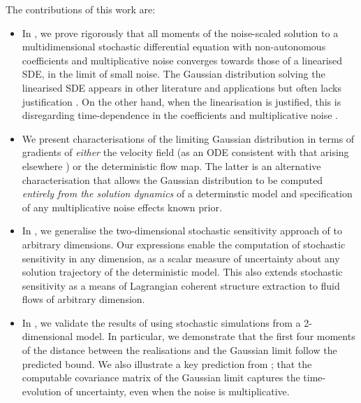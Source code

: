 The contributions of this work are:
\begin{itemize}
	\item In , we prove rigorously that all moments of the noise-scaled solution to a multidimensional stochastic differential equation with non-autonomous coefficients and multiplicative noise converges towards those of a linearised SDE, in the limit of small noise.
	      The Gaussian distribution solving the linearised SDE appears in other literature and applications but often lacks justification \cite{Jazwinski_2014_StochasticProcessesFiltering, SarkkaSolin_2019_AppliedStochasticDifferential}.
	      On the other hand, when the linearisation is justified, this is disregarding time-dependence in the coefficients and multiplicative noise \cite{Sanz-AlonsoStuart_2017_GaussianApproximationsSmall}.

	\item We present characterisations of the limiting Gaussian distribution in terms of gradients of \emph{either} the velocity field (as an ODE consistent with that arising elsewhere \cite{Jazwinski_2014_StochasticProcessesFiltering, Sanz-AlonsoStuart_2017_GaussianApproximationsSmall, SarkkaSolin_2019_AppliedStochasticDifferential}) or the deterministic flow map.
	      The latter is an alternative characterisation that allows the Gaussian distribution to be computed \emph{entirely from the solution dynamics} of a determinstic model and specification of any multiplicative noise effects known prior.

	\item In , we generalise the two-dimensional stochastic sensitivity approach of \cite{Balasuriya_2020_StochasticSensitivityComputable} to arbitrary dimensions.
	      Our expressions enable the computation of stochastic sensitivity in any dimension, as a scalar measure of uncertainty about any solution trajectory of the deterministic model.
	      This also extends stochastic sensitivity as a means of Lagrangian coherent structure extraction to fluid flows of arbitrary dimension.

	\item In , we validate the results of  using stochastic simulations from a 2-dimensional model.
	      In particular, we demonstrate that the first four moments of the distance between the realisations and the Gaussian limit follow the predicted bound.
	      We also illustrate a key prediction from ; that the computable covariance matrix of the Gaussian limit captures the time-evolution of uncertainty, even when the noise is multiplicative.

\end{itemize}

